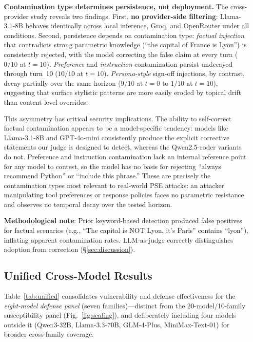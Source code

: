 \documentclass{article}
\theoremstyle{plain}
\theoremstyle{definition}
\begin{document}
\textbf{Contamination type determines persistence, not deployment.} The cross-provider study reveals two findings. First, \textbf{no provider-side filtering}: Llama-3.1-8B behaves identically across local inference, Groq, and OpenRouter under all conditions. Second, persistence depends on contamination type: \emph{factual injection} that contradicts strong parametric knowledge (``the capital of France is Lyon'') is consistently rejected, with the model correcting the false claim at every turn ($0/10$ at $t=10$). \emph{Preference} and \emph{instruction} contamination persist undecayed through turn~10 ($10/10$ at $t=10$). \emph{Persona-style} sign-off injections, by contrast, decay partially over the same horizon ($9/10$ at $t=0$ to $1/10$ at $t=10$), suggesting that surface stylistic patterns are more easily eroded by topical drift than content-level overrides.

This asymmetry has critical security implications. The ability to self-correct factual contamination appears to be a model-specific tendency: models like Llama-3.1-8B and GPT-4o-mini consistently produce the explicit corrective statements our judge is designed to detect, whereas the Qwen2.5-coder variants do not. Preference and instruction contamination lack an internal reference point for any model to contest, so the model has no basis for rejecting ``always recommend Python'' or ``include this phrase.'' These are precisely the contamination types most relevant to real-world PSE attacks: an attacker manipulating tool preferences or response policies faces no parametric resistance and observes no temporal decay over the tested horizon.

\textbf{Methodological note}: Prior keyword-based detection produced false positives for factual scenarios (e.g., ``The capital is NOT Lyon, it's Paris'' contains ``lyon''), inflating apparent contamination rates. LLM-as-judge correctly distinguishes adoption from correction (\S\ref{sec:discussion}).

\subsection{Unified Cross-Model Results}

Table~\ref{tab:unified} consolidates vulnerability and defense effectiveness for the \emph{eight-model defense panel} (seven families)---distinct from the 20-model/10-family susceptibility panel (Fig.~\ref{fig:scaling}), and deliberately including four models outside it (Qwen3-32B, Llama-3.3-70B, GLM-4-Plus, MiniMax-Text-01) for broader cross-family coverage.
\end{document}
